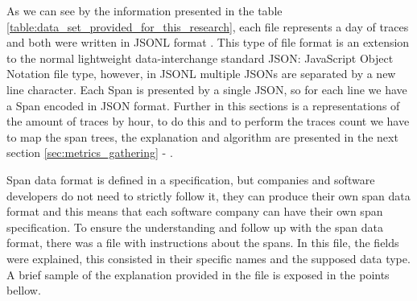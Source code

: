 As we can see by the information presented in the table \ref{table:data_set_provided_for_this_research}, each file represents a day of traces and both were written in JSONL format \cite{jsonl}. This type of file format is an extension to the normal lightweight data-interchange standard JSON: JavaScript Object Notation file type, however, in JSONL multiple JSONs are separated by a new line character. Each Span is presented by a single JSON, so for each line we have a Span encoded in JSON format. Further in this sections is a representations of the amount of traces by hour, to do this and to perform the traces count we have to map the span trees, the explanation and algorithm are presented in the next section \ref{sec:metrics_gathering} - .

Span data format is defined in a specification, but companies and software developers do not need to strictly follow it, they can produce their own span data format and this means that each software company can have their own span specification. To ensure the understanding and follow up with the span data format, there was a file with instructions about the spans. In this file, the fields were explained, this consisted in their specific names and the supposed data type. A brief sample of the explanation provided in the file is exposed in the points bellow.


